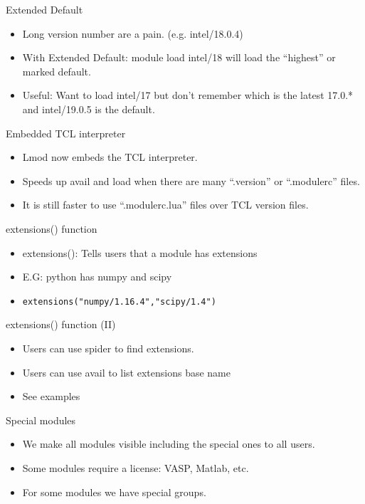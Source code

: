 \documentclass{beamer}
\begin{document}
\begin{frame}{Extended Default}
  \begin{itemize}
    \item Long version number are a pain. (e.g. intel/18.0.4)
    \item With Extended Default: module load intel/18 will load the
      ``highest'' or marked default.
    \item Useful: Want to load intel/17 but don't
      remember which is the latest 17.0.* and intel/19.0.5 is the default.
  \end{itemize}
\end{frame}


\begin{frame}{Embedded TCL interpreter}
  \begin{itemize}
    \item Lmod now embeds the TCL interpreter.
    \item Speeds up avail and load when there are many ``.version'' or
      ``.modulerc'' files.
    \item It is still faster to use ``.modulerc.lua'' files over TCL
      version files.
  \end{itemize}
\end{frame}


\begin{frame}{extensions() function}
  \begin{itemize}
    \item extensions(): Tells users that a module has extensions
    \item E.G: python has numpy and scipy
    \item \texttt{extensions("numpy/1.16.4","scipy/1.4")}
  \end{itemize}
\end{frame}

\begin{frame}{extensions() function (II)}
  \begin{itemize}
    \item Users can use spider to find extensions.
    \item Users can use avail to list extensions base name
    \item See examples
  \end{itemize}
\end{frame}

\begin{frame}{Special modules}
  \begin{itemize}
    \item We make all modules visible including the special ones to all users.
    \item Some modules require a license: VASP, Matlab, etc.
    \item For some modules we have special groups.
  \end{itemize}
\end{frame}
\end{document}
